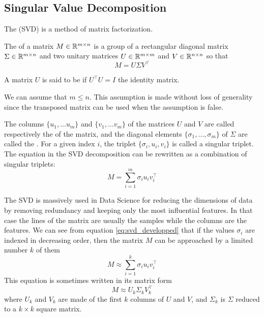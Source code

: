 \subsection{Singular Value Decomposition}
The  (SVD) is a method of matrix factorization.
\begin{definition}
    The  of a matrix $M \in \mathbb{R}^{m\times n}$ is a group of a rectangular diagonal matrix $\Sigma \in \mathbb{R}^{m \times n}$ and two unitary matrices $U \in \mathbb{R}^{m\times m}$ and $V \in \mathbb{R}^{n\times n}$ so that
    \begin{equation}
        M = U\Sigma V^\top
    \end{equation}
\end{definition}
A matrix $U$ is said to be  if $U^\top U = I$ the identity matrix.

We can assume that $m \leq n$. This assumption is made without loss of generality since the transposed matrix can be used when the assumption is false.

The columns $\{u_1,\dots u_m\}$ and $\{v_1, \dots v_m\}$ of the matrices $U$ and $V$ are called respectively the  of the matrix, and the diagonal elements $\{\sigma_1, \dots, \sigma_m\}$ of $\Sigma$ are called the . For a given index $i$, the triplet $\{\sigma_i, u_i, v_i\}$ is called a singular triplet. The equation in the SVD decomposition can be rewritten as a combination of singular triplets:
\begin{equation}\label{eq:svd_developped}
    M = \sum_{i=1}^m \sigma_i u_i v_i^\top
\end{equation}

The SVD is massively used in Data Science for reducing the dimensions of data by removing redundancy and keeping only the most influential features. In that case the lines of the matrix are usually the samples while the columns are the features. We can see from equation \ref{eq:svd_developped} that if the values $\sigma_i$ are indexed in decreasing order, then the matrix $M$ can be approached by a limited number $k$ of them
\begin{equation}\label{eq:svd_trunc_developped}
    M \approx \sum_{i=1}^k \sigma_i u_i v_i^\top
\end{equation}
This equation is sometimes written in its matrix form
\begin{equation}
    M \approx U_k\Sigma_k V_k^\top
\end{equation}
where $U_k$ and $V_k$ are made of the first $k$ columns of $U$ and $V$, and $\Sigma_k$ is $\Sigma$ reduced to a $k\times k$ square matrix.

